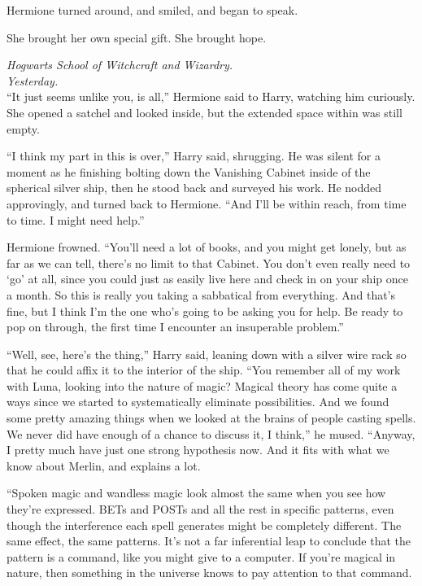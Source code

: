 Hermione turned around, and smiled, and began to speak.

She brought her own special gift. She brought hope.

\mybreak

\emph{Hogwarts School of Witchcraft and Wizardry.}\\
\emph{Yesterday.}\\

``It just seems unlike you, is all,'' Hermione said to Harry, watching
him curiously. She opened a satchel and looked inside, but the extended
space within was still empty.

``I think my part in this is over,'' Harry said, shrugging. He was
silent for a moment as he finishing bolting down the Vanishing Cabinet
inside of the spherical silver ship, then he stood back and surveyed his
work. He nodded approvingly, and turned back to Hermione. ``And I'll be
within reach, from time to time. I might need help.''

Hermione frowned. ``You'll need a lot of books, and you might get
lonely, but as far as we can tell, there's no limit to that Cabinet. You
don't even really need to `go' at all, since you could just as easily
live here and check in on your ship once a month. So this is really you
taking a sabbatical from everything. And that's fine, but I think I'm
the one who's going to be asking you for help. Be ready to pop on
through, the first time I encounter an insuperable problem.''

``Well, see, here's the thing,'' Harry said, leaning down with a silver
wire rack so that he could affix it to the interior of the ship. ``You
remember all of my work with Luna, looking into the nature of magic?
Magical theory has come quite a ways since we started to systematically
eliminate possibilities. And we found some pretty amazing things when we
looked at the brains of people casting spells. We never did have enough
of a chance to discuss it, I think,'' he mused. ``Anyway, I pretty much
have just one strong hypothesis now. And it fits with what we know about
Merlin, and explains a lot.

``Spoken magic and wandless magic look almost the same when you see how
they're expressed. BETs and POSTs and all the rest in specific patterns,
even though the interference each spell generates might be completely
different. The same effect, the same patterns. It's not a far
inferential leap to conclude that the pattern is a command, like you
might give to a computer. If you're magical in nature, then something in
the universe knows to pay attention to that command.

